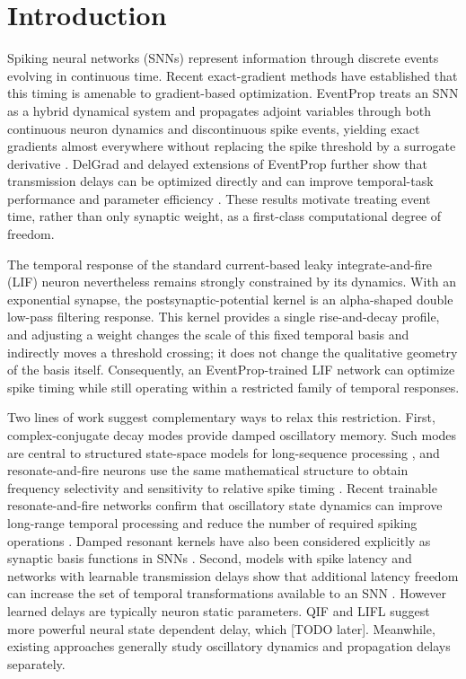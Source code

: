 \section{Introduction}
\label{sec:introduction}

Spiking neural networks (SNNs) represent information through discrete events evolving in continuous time. Recent exact-gradient methods have established that this timing is amenable to gradient-based optimization. EventProp treats an SNN as a hybrid dynamical system and propagates adjoint variables through both continuous neuron dynamics and discontinuous spike events, yielding exact gradients almost everywhere without replacing the spike threshold by a surrogate derivative \cite{wunderlich2021eventprop}. DelGrad and delayed extensions of EventProp further show that transmission delays can be optimized directly and can improve temporal-task performance and parameter efficiency \cite{goeltz2025delgrad,meszaros2025delay}. These results motivate treating event time, rather than only synaptic weight, as a first-class computational degree of freedom.

The temporal response of the standard current-based leaky integrate-and-fire (LIF) neuron nevertheless remains strongly constrained by its dynamics. With an exponential synapse, the postsynaptic-potential kernel is an alpha-shaped double low-pass filtering response. This kernel provides a single rise-and-decay profile, and adjusting a weight changes the scale of this fixed temporal basis and indirectly moves a threshold crossing; it does not change the qualitative geometry of the basis itself. Consequently, an EventProp-trained LIF network can optimize spike timing while still operating within a restricted family of temporal responses.

Two lines of work suggest complementary ways to relax this restriction. First, complex-conjugate decay modes provide damped oscillatory memory. Such modes are central to structured state-space models for long-sequence processing \cite{gu2022s4}, and resonate-and-fire neurons use the same mathematical structure to obtain frequency selectivity and sensitivity to relative spike timing \cite{izhikevich2001resonate}. Recent trainable resonate-and-fire networks confirm that oscillatory state dynamics can improve long-range temporal processing and reduce the number of required spiking operations \cite{huber2025s5rf}. Damped resonant kernels have also been considered explicitly as synaptic basis functions in SNNs \cite{tapson2013skim}. Second, models with spike latency and networks with learnable transmission delays show that additional latency freedom can increase the set of temporal transformations available to an SNN \cite{susi2018lifl,goeltz2025delgrad,meszaros2025delay}. However learned delays are typically neuron static parameters. QIF \cite{wenig2026qif} and LIFL \cite{susi2018lifl} suggest more powerful neural state dependent delay, which [TODO later]. Meanwhile, existing approaches generally study oscillatory dynamics and propagation delays separately.

